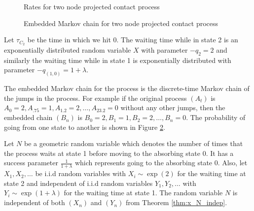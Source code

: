 \begin{figure}[H]
    \centering
    \caption{Rates for two node projected contact process}
    \label{fig:rates_mc_two_contact}
\end{figure}

\begin{figure}[H]
    \centering
    \caption{Embedded Markov chain for two node projected contact process}
    \label{fig:discrete_mc_two_contact}
\end{figure}

Let $\tau_{C_2}$ be the time in which we hit 0.
The waiting time while in state 2 is an exponentially distributed random variable $X$ with parameter $- q_{2} = 2$ and similarly the waiting time while in state 1 is exponentially distributed with parameter $- q_{(1,0)} = 1 + \lambda$.

The embedded Markov chain for the process is the discrete-time Markov chain of the jumps in the process.
For example if the original process $(A_t)$ is $A_{0} = 2, A_{.75} = 1, A_{1.2} = 2, \ldots, A_{23.2} = 0$ without any other jumps, then the embedded chain $(B_n)$ is $B_{0} = 2, B_1 = 1, B_2 = 2, \ldots, B_n = 0$.
The probability of going from one state to another is shown in Figure \ref{fig:discrete_mc_two_contact}.

Let $N$ be a geometric random variable which denotes the number of times that the process waits at state 1 before moving to the absorbing state 0.
It has a success parameter $\frac{1}{1 + \lambda}$ which represents going to the absorbing state 0.
Also, let $X_1, X_2, \ldots$ be i.i.d random variables with
$X_i \sim \exp(2)$ for the waiting time at state 2 and independent of i.i.d random variables $Y_1, Y_2, \ldots$ with  $Y_i \sim \exp(1 + \lambda)$ for the waiting time at state 1.
The random variable $N$ is independent of both $(X_n)$ and $(Y_n)$ from Theorem \ref{thm:x_N_indep}.

